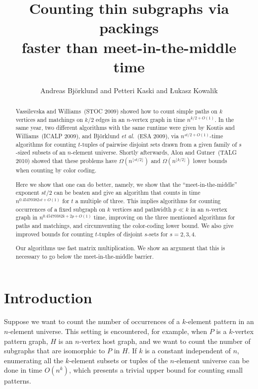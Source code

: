 \documentclass{amsart}
\begin{document}
\title []{Counting thin subgraphs via packings\\faster than meet-in-the-middle time}
\author []{Andreas Bj\"orklund and Petteri Kaski and \L ukasz Kowalik}

\begin{abstract}
Vassilevska and Williams~(STOC 2009) showed how to count simple paths on $k$ vertices and matchings on $k/2$ edges in an $n$-vertex graph in time $n^{k/2+O(1)}$. In the same year, two different algorithms with the same runtime were given by Koutis and Williams~(ICALP 2009), and Bj\"orklund \emph{et al.}~(ESA 2009), via $n^{st/2+O(1)}$-time algorithms for counting $t$-tuples of pairwise disjoint sets drawn from a given family of $s$-sized subsets of an $n$-element universe.
Shortly afterwards, Alon and Gutner~(TALG 2010) showed that these problems have $\Omega(n^{\lfloor st/2\rfloor})$ and $\Omega(n^{\lfloor k/2\rfloor})$ lower bounds when counting by color coding. 

Here we show that one can do better, namely, we show that the ``meet-in-the-middle'' exponent $st/2$ can be beaten and give an algorithm that counts in time $n^{0.45470382 st + O(1)}$ for $t$ a multiple of three. This implies algorithms for counting occurrences of a fixed subgraph on $k$ vertices and pathwidth $p\ll k$ in an $n$-vertex graph in $n^{0.45470382k+2p+O(1)}$ time, improving on the three mentioned algorithms for paths and matchings, and circumventing the color-coding lower bound. 
We also give improved bounds for counting $t$-tuples of disjoint $s$-sets for $s=2,3,4$. 

Our algorithms use fast matrix multiplication. We show an argument that this is necessary to go below the meet-in-the-middle barrier.
\end{abstract}

\maketitle




\section{Introduction}

Suppose we want to count the number of occurrences of a $k$-element pattern 
in an $n$-element universe. This setting is encountered, for example,
when $P$ is a $k$-vertex pattern graph, $H$ is an $n$-vertex host graph, and 
we want to count the number of subgraphs that are isomorphic to $P$ in $H$.
If $k$ is a constant independent of $n$, enumerating all the $k$-element 
subsets or tuples of the $n$-element universe can be done in time $O(n^k)$, 
which presents a trivial upper bound for counting small patterns. 
\end{document}
